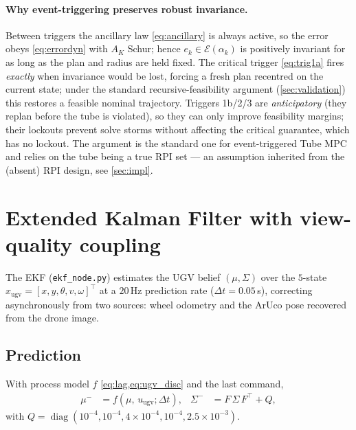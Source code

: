 \documentclass[11pt]{article}
\DeclareMathOperator{\diag}{diag}
\newcommand{\code}[1]{\texttt{#1}}
\begin{document}
\paragraph{Why event-triggering preserves robust invariance.} Between triggers the ancillary law
\cref{eq:ancillary} is always active, so the error obeys \cref{eq:errordyn} with $A_K$ Schur; hence
$e_k\in\mathcal{E}(\alpha_k)$ is positively invariant for as long as the plan and radius are held fixed. The
critical trigger \cref{eq:trig1a} fires \emph{exactly} when invariance would be lost, forcing a fresh plan
recentred on the current state; under the standard recursive-feasibility argument
(\cref{sec:validation}) this restores a feasible nominal trajectory. Triggers 1b/2/3 are \emph{anticipatory}
(they replan before the tube is violated), so they can only improve feasibility margins; their lockouts
prevent solve storms without affecting the critical guarantee, which has no lockout. The argument is the
standard one for event-triggered Tube MPC and relies on the tube being a true RPI set --- an assumption
inherited from the (absent) RPI design, see \cref{sec:impl}.

\section{Extended Kalman Filter with view-quality coupling}
\label{sec:ekf}

The EKF (\code{ekf\_node.py}) estimates the UGV belief $(\mu,\Sigma)$ over the $5$-state
$x_{\text{ugv}}=[x,y,\theta,v,\omega]^\top$ at a $20$\,Hz prediction rate ($\Delta t=0.05$\,s), correcting
asynchronously from two sources: wheel odometry and the ArUco pose recovered from the drone image.

\subsection{Prediction}
With process model $f$ \cref{eq:lag,eq:ugv_disc} and the last command,
\begin{align}
\mu^- &= f(\mu,\,u_{\text{ugv}};\Delta t), &
\Sigma^- &= F\,\Sigma\,F^\top + Q,
\label{eq:ekfpredict}
\end{align}
with $Q=\diag(10^{-4},10^{-4},4{\times}10^{-4},10^{-4},2.5{\times}10^{-3})$.
\end{document}
